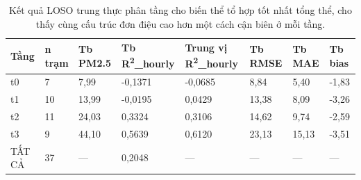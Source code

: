 {\small
\begin{longtable}{llllllll}
\caption{Kết quả LOSO trung thực phân tầng cho biến thể tổ hợp tốt nhất tổng thể, cho thấy cùng cấu trúc đơn điệu cao hơn một cách cận biên ở mỗi tầng.}\\
\toprule
\textbf{Tầng} & \textbf{n trạm} & \textbf{Tb PM2.5} & \textbf{Tb R\textsuperscript{2}\_hourly} & \textbf{Trung vị R\textsuperscript{2}\_hourly} & \textbf{Tb RMSE} & \textbf{Tb MAE} & \textbf{Tb bias} \\
\midrule\endhead
t0 & 7 & 7,99 & -0,1371 & -0,0685 & 8,84 & 5,40 & -1,83 \\
t1 & 10 & 13,99 & -0,0195 & 0,0429 & 13,38 & 8,09 & -3,26 \\
t2 & 11 & 24,03 & 0,3324 & 0,3106 & 14,62 & 9,74 & -2,59 \\
t3 & 9 & 44,10 & 0,5639 & 0,6120 & 23,13 & 15,13 & -3,51 \\
TẤT CẢ & 37 & --- & 0,2048 & --- & --- & --- & --- \\
\bottomrule
\end{longtable}
}


